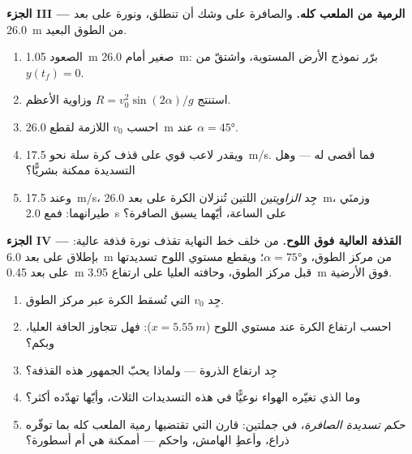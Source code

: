 \begin{problem}
\medskip\noindent\textbf{الجزء III --- الرمية من الملعب كله.} والصافرة على وشك
أن تنطلق، ونورة على بعد \qty{26.0}{m} من الطوق البعيد.
\begin{enumerate}[resume]
  \item الصعود \qty{1.05}{m} صغير أمام \qty{26.0}{m}: برّر نموذج
        الأرض المستوية، واشتقّ  من $y(t_f) = 0$.
  \item استنتج $R = v_0^2\sin(2\alpha)/g$ وزاوية  الأعظم.
  \item احسب $v_0$ اللازمة لقطع \qty{26.0}{m} عند $\alpha = \ang{45}$.
  \item ويقدر لاعب قوي على قذف كرة سلة  نحو \qty{17.5}{m/s}.
        فما أقصى  له --- وهل التسديدة ممكنة بشريًّا؟
  \item وعند \qty{17.5}{m/s}، جِد \emph{الزاويتين} اللتين تُنزلان الكرة
        على بعد \qty{26.0}{m}، وزمنَي طيرانهما: فمع \qty{2.0}{s} على
        الساعة، أيّهما يسبق الصافرة؟
\end{enumerate}

\medskip\noindent\textbf{الجزء IV --- القذفة العالية فوق اللوح.} من
خلف خط النهاية تقذف نورة قذفة عالية: بإطلاق على بعد \qty{6.0}{m} من مركز الطوق،
و$\alpha = \ang{75}$؛ ويقطع مستوي اللوح تسديدتها على بعد \qty{0.45}{m}
قبل مركز الطوق، وحافته العليا على ارتفاع \qty{3.95}{m} فوق الأرضية.
\begin{enumerate}[resume]
  \item جِد $v_0$ التي تُسقط الكرة عبر مركز الطوق.
  \item احسب ارتفاع الكرة عند مستوي اللوح
        ($x = \qty{5.55}{m}$): فهل تتجاوز الحافة العليا، وبكم؟
  \item جِد ارتفاع الذروة  --- ولماذا يحبّ الجمهور هذه القذفة؟
  \item وما الذي تغيّره  الهواء نوعيًّا في هذه التسديدات الثلاث،
        وأيّها تهدّده أكثر؟
  \item \emph{حكم تسديدة الصافرة}، في جملتين: قارن 
        التي تقتضيها رمية الملعب كله بما توفّره ذراع، وأعطِ
        الهامش، واحكم --- أممكنة هي أم أسطورة؟
\end{enumerate}
\end{problem}
